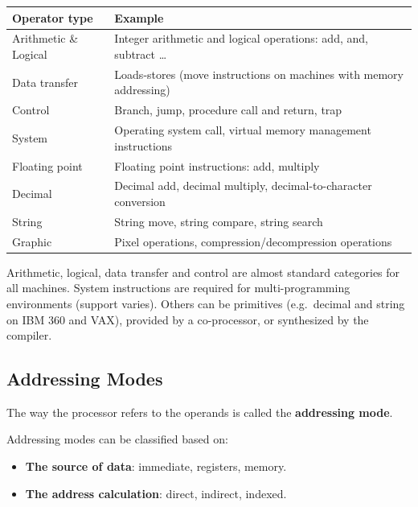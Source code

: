 \begin{center}
\begin{tabular}{@{}p{3.2cm}p{10.5cm}@{}}
\toprule
Operator type & Example \\
\midrule
Arithmetic \& Logical & Integer arithmetic and logical operations: add, and,
subtract \dots \\
Data transfer & Loads-stores (move instructions on machines with memory
addressing) \\
Control & Branch, jump, procedure call and return, trap \\
System & Operating system call, virtual memory management instructions \\
Floating point & Floating point instructions: add, multiply \\
Decimal & Decimal add, decimal multiply, decimal-to-character conversion \\
String & String move, string compare, string search \\
Graphic & Pixel operations, compression/decompression operations \\
\bottomrule
\end{tabular}
\end{center}

\begin{remark}
Arithmetic, logical, data transfer and control are almost standard
categories for all machines. System instructions are required for
multi-programming environments (support varies). Others can be primitives
(e.g.\ decimal and string on IBM 360 and VAX), provided by a co-processor,
or synthesized by the compiler.
\end{remark}

\subsection{Addressing Modes}

\begin{definition}
The way the processor refers to the operands is called the
\textbf{addressing mode}.
\end{definition}
Addressing modes can be classified based on:
\begin{itemize}
  \item \textbf{The source of data}: immediate, registers, memory.
  \item \textbf{The address calculation}: direct, indirect, indexed.
\end{itemize}


